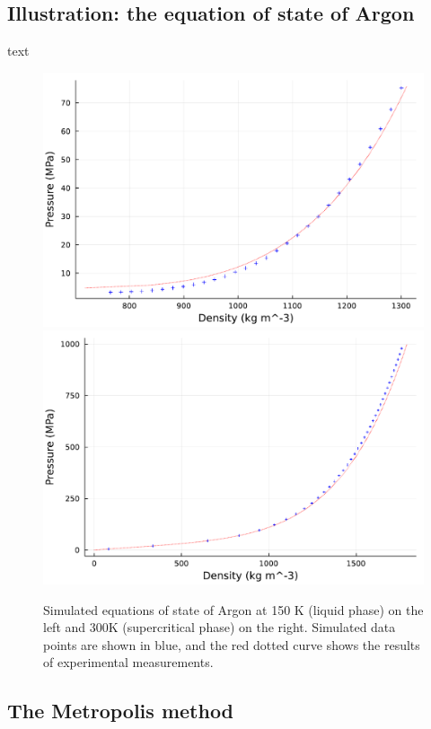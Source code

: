 \subsection{Illustration: the equation of state of Argon}
text
\begin{figure}[htbp]
    \begin{center}
      \includegraphics[width=0.49\linewidth]{figures/chapter1/argon_150K.pdf}
      \includegraphics[width=0.49\linewidth]{figures/chapter1/argon_300K_sparse.pdf}
      \caption{ \label{fig:eos_argon}
        Simulated equations of state of Argon at 150 K (liquid phase) on the left and 300K (supercritical phase) on the right. Simulated data points are shown in blue, and the red dotted curve shows the results of experimental measurements.
      }
    \end{center}
  \end{figure}
\subsection{The Metropolis method}